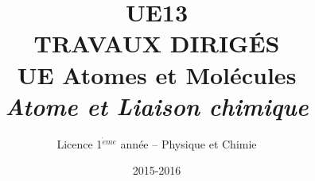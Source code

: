 \documentclass[12pt,french,dvips]{report}
\title{{\Huge \textbf{UE13  \\ 
TRAVAUX DIRIG\'ES  \\[1.5cm] 
UE Atomes et Mol\'ecules \\
\textsl{Atome et Liaison chimique}}}\\[3cm]
\vspace{2cm}}
\author{Licence 1$^{\grave{e}me}$ ann\'ee -- Physique et Chimie}
\date{2015-2016}
\begin{document}

\newcommand{\secd}{\alpha - \varepsilon_i}
\newcommand{\bulletd}{\small \begin{tabular}{c} $\bullet$ \\[-0.3cm] $\bullet$ \\ \end{tabular}}

\newcommand{\bra}{\left\langle}
\newcommand{\ket}{\right\rangle}

\pagestyle{empty}
\maketitle

\cleardoublepage


\pagestyle{plain}
\tableofcontents

\cleardoublepage




%
%
%





\cleardoublepage

\pagestyle{empty}



%
%
\end{document}
